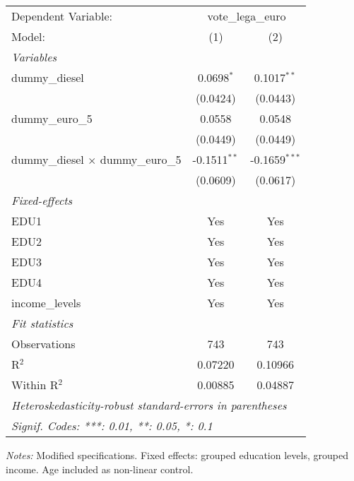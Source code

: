 
\begingroup
\centering
\begin{tabular}{lcc}
   \tabularnewline \midrule \midrule
   Dependent Variable: & \multicolumn{2}{c}{vote\_lega\_euro}\\
   Model:                                    & (1)            & (2)\\  
   \midrule
   \emph{Variables}\\
   dummy\_diesel                             & 0.0698$^{*}$   & 0.1017$^{**}$\\   
                                             & (0.0424)       & (0.0443)\\   
   dummy\_euro\_5                            & 0.0558         & 0.0548\\   
                                             & (0.0449)       & (0.0449)\\   
   dummy\_diesel $\times$ dummy\_euro\_5     & -0.1511$^{**}$ & -0.1659$^{***}$\\   
                                             & (0.0609)       & (0.0617)\\   
   \midrule
   \emph{Fixed-effects}\\
   EDU1                                      & Yes            & Yes\\  
   EDU2                                      & Yes            & Yes\\  
   EDU3                                      & Yes            & Yes\\  
   EDU4                                      & Yes            & Yes\\  
   income\_levels                            & Yes            & Yes\\  
   \midrule
   \emph{Fit statistics}\\
   Observations                              & 743            & 743\\  
   R$^2$                                     & 0.07220        & 0.10966\\  
   Within R$^2$                              & 0.00885        & 0.04887\\  
   \midrule \midrule
   \multicolumn{3}{l}{\emph{Heteroskedasticity-robust standard-errors in parentheses}}\\
   \multicolumn{3}{l}{\emph{Signif. Codes: ***: 0.01, **: 0.05, *: 0.1}}\\
\end{tabular}
 
\par \raggedright 
\textit{Notes:} Modified specifications. Fixed effects: grouped education levels, grouped income. Age included as non-linear control.
\par\endgroup


